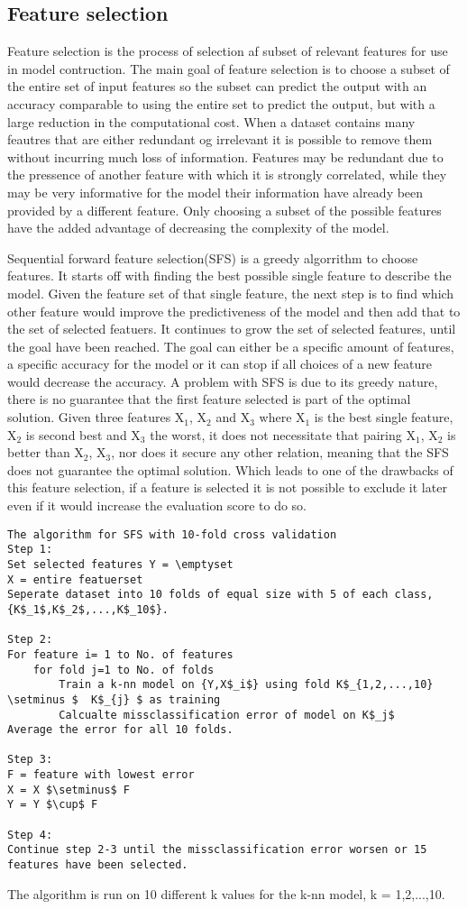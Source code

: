 \subsection{Feature selection}
Feature selection is the process of selection af subset of relevant features for use in model contruction.
The main goal of feature selection is to choose a subset of the entire set of input features so the subset can predict the output with an accuracy comparable to using the entire set to predict the output, but with a large reduction in the computational cost.
When a dataset contains many feautres that are either redundant og irrelevant it is possible to remove them without incurring much loss of information. Features may be redundant due to the pressence of another feature with which it is strongly correlated, while they may be very informative for the model their information have already been provided by a different feature. Only choosing a subset of the possible features have the added advantage of decreasing the complexity of the model.

Sequential forward feature selection(SFS) is a greedy algorrithm to choose features.
It starts off with finding the best possible single feature to describe the model. Given the feature set of that single feature, the next step is to find which other feature would improve the predictiveness of the model and then add that to the set of selected featuers. It continues to grow the set of selected features, until the goal have been reached. The goal can either be a specific amount of features, a specific accuracy for the model or it can stop if all choices of a new feature would decrease the accuracy.
A problem with SFS is due to its greedy nature, there is no guarantee that the first feature selected is part of the optimal solution. Given three features X$_1$, X$_2$ and X$_3$ where X$_1$ is the best single feature, X$_2$ is second best and X$_3$ the worst, it does not necessitate that pairing {X$_1$, X$_2$ } is better than {X$_2$, X$_3$}, nor does it secure any other relation, meaning that the SFS does not guarantee the optimal solution. Which leads to one of the drawbacks of this feature selection, if a feature is selected it is not possible to exclude it later even if it would increase the evaluation score to do so.

\begin{lstlisting}[mathescape=true]
The algorithm for SFS with 10-fold cross validation
Step 1:
Set selected features Y = \emptyset
X = entire featuerset
Seperate dataset into 10 folds of equal size with 5 of each class, {K$_1$,K$_2$,...,K$_10$}.

Step 2:
For feature i= 1 to No. of features
	for fold j=1 to No. of folds
		Train a k-nn model on {Y,X$_i$} using fold K$_{1,2,...,10} \setminus $  K$_{j} $ as training
		Calcualte missclassification error of model on K$_j$
Average the error for all 10 folds.

Step 3:
F = feature with lowest error
X = X $\setminus$ F
Y = Y $\cup$ F

Step 4:
Continue step 2-3 until the missclassification error worsen or 15 features have been selected.
\end{lstlisting}
The algorithm is run on 10 different k values for the k-nn model, k = 1,2,...,10.

